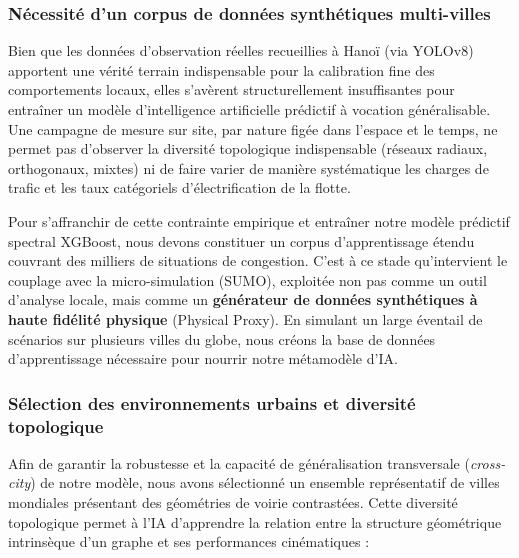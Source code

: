 \documentclass[10pt, a4paper]{article}
\begin{document}
\subsubsection{Nécessité d'un corpus de données synthétiques
multi-villes}\label{nuxe9cessituxe9-dun-corpus-de-donnuxe9es-synthuxe9tiques-multi-villes}

Bien que les données d'observation réelles recueillies à Hanoï (via
YOLOv8) apportent une vérité terrain indispensable pour la calibration
fine des comportements locaux, elles s'avèrent structurellement
insuffisantes pour entraîner un modèle d'intelligence artificielle
prédictif à vocation généralisable. Une campagne de mesure sur site, par
nature figée dans l'espace et le temps, ne permet pas d'observer la
diversité topologique indispensable (réseaux radiaux, orthogonaux,
mixtes) ni de faire varier de manière systématique les charges de trafic
et les taux catégoriels d'électrification de la flotte.

Pour s'affranchir de cette contrainte empirique et entraîner notre
modèle prédictif spectral XGBoost, nous devons constituer un corpus
d'apprentissage étendu couvrant des milliers de situations de
congestion. C'est à ce stade qu'intervient le couplage avec la
micro-simulation (SUMO), exploitée non pas comme un outil d'analyse
locale, mais comme un \textbf{générateur de données synthétiques à haute
fidélité physique} (Physical Proxy). En simulant un large éventail de
scénarios sur plusieurs villes du globe, nous créons la base de données
d'apprentissage nécessaire pour nourrir notre métamodèle d'IA.

\subsubsection{Sélection des environnements urbains et diversité
topologique}\label{suxe9lection-des-environnements-urbains-et-diversituxe9-topologique}

Afin de garantir la robustesse et la capacité de généralisation
transversale (\emph{cross-city}) de notre modèle, nous avons sélectionné
un ensemble représentatif de villes mondiales présentant des géométries
de voirie contrastées. Cette diversité topologique permet à l'IA
d'apprendre la relation entre la structure géométrique intrinsèque d'un
graphe et ses performances cinématiques :
\end{document}
